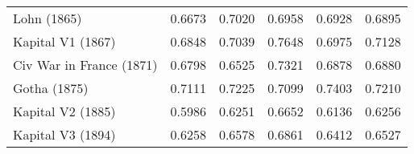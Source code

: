 \begin{table}
\begin{tabular}{lrrrrr}
Lohn (1865)              &                 0.6673 &        0.7020 &        0.6958 &          0.6928 & 0.6895 \\
Kapital V1 (1867)        &                 0.6848 &        0.7039 &        0.7648 &          0.6975 & 0.7128 \\
Civ War in France (1871) &                 0.6798 &        0.6525 &        0.7321 &          0.6878 & 0.6880 \\
Gotha (1875)             &                 0.7111 &        0.7225 &        0.7099 &          0.7403 & 0.7210 \\
Kapital V2 (1885)        &                 0.5986 &        0.6251 &        0.6652 &          0.6136 & 0.6256 \\
Kapital V3 (1894)        &                 0.6258 &        0.6578 &        0.6861 &          0.6412 & 0.6527 \\
\bottomrule
\end{tabular}
\end{table}
